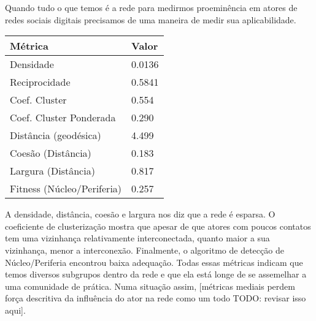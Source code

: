 \documentclass{article}
\begin{document}
Quando tudo o que temos é a rede para medirmos proeminência em atores de redes
sociais digitais precisamos de uma maneira de medir sua aplicabilidade.


\begin{tabular}{| l | l |}
\hline
Métrica & Valor \\ \hline
Densidade & 0.0136 \\
Reciprocidade & 0.5841 \\
Coef. Cluster & 0.554 \\
Coef. Cluster Ponderada & 0.290 \\
Distância (geodésica) & 4.499 \\
Coesão (Distância) & 0.183 \\
Largura (Distância) & 0.817 \\
Fitness (Núcleo/Periferia) & 0.257 \\
\hline
\end{tabular}

A densidade, distância, coesão e largura nos diz que a rede é esparsa. O
coeficiente de clusterização mostra que apesar de que atores com poucos contatos
tem uma vizinhança relativamente interconectada, quanto maior a sua vizinhança,
menor a interconexão. Finalmente, o algoritmo de detecção de Núcleo/Periferia
encontrou baixa adequação. Todas essas métricas indicam que temos diversos
subgrupos dentro da rede e que ela está longe de se assemelhar a uma comunidade
de prática. Numa situação assim, [métricas mediais perdem força descritiva da
influência do ator na rede como um todo TODO: revisar isso aqui].
\end{document}
